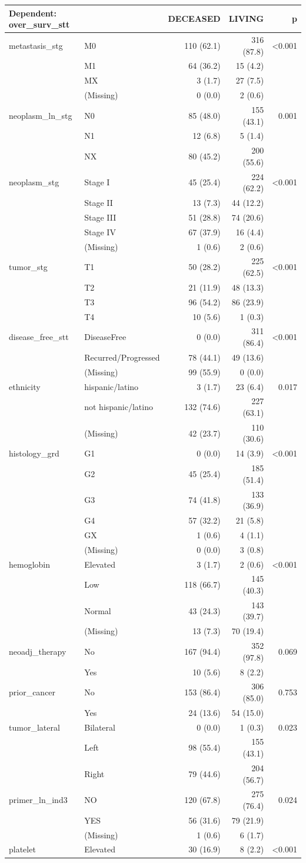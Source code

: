 \documentclass[]{article}
\begin{document}
\begin{longtable}[]{@{}llrrr@{}}
\toprule
Dependent: over\_surv\_stt & & DECEASED & LIVING & p\tabularnewline
\midrule
\endhead
metastasis\_stg & M0 & 110 (62.1) & 316 (87.8) &
\textless{}0.001\tabularnewline
& M1 & 64 (36.2) & 15 (4.2) &\tabularnewline
& MX & 3 (1.7) & 27 (7.5) &\tabularnewline
& (Missing) & 0 (0.0) & 2 (0.6) &\tabularnewline
neoplasm\_ln\_stg & N0 & 85 (48.0) & 155 (43.1) & 0.001\tabularnewline
& N1 & 12 (6.8) & 5 (1.4) &\tabularnewline
& NX & 80 (45.2) & 200 (55.6) &\tabularnewline
neoplasm\_stg & Stage I & 45 (25.4) & 224 (62.2) &
\textless{}0.001\tabularnewline
& Stage II & 13 (7.3) & 44 (12.2) &\tabularnewline
& Stage III & 51 (28.8) & 74 (20.6) &\tabularnewline
& Stage IV & 67 (37.9) & 16 (4.4) &\tabularnewline
& (Missing) & 1 (0.6) & 2 (0.6) &\tabularnewline
tumor\_stg & T1 & 50 (28.2) & 225 (62.5) &
\textless{}0.001\tabularnewline
& T2 & 21 (11.9) & 48 (13.3) &\tabularnewline
& T3 & 96 (54.2) & 86 (23.9) &\tabularnewline
& T4 & 10 (5.6) & 1 (0.3) &\tabularnewline
disease\_free\_stt & DiseaseFree & 0 (0.0) & 311 (86.4) &
\textless{}0.001\tabularnewline
& Recurred/Progressed & 78 (44.1) & 49 (13.6) &\tabularnewline
& (Missing) & 99 (55.9) & 0 (0.0) &\tabularnewline
ethnicity & hispanic/latino & 3 (1.7) & 23 (6.4) & 0.017\tabularnewline
& not hispanic/latino & 132 (74.6) & 227 (63.1) &\tabularnewline
& (Missing) & 42 (23.7) & 110 (30.6) &\tabularnewline
histology\_grd & G1 & 0 (0.0) & 14 (3.9) &
\textless{}0.001\tabularnewline
& G2 & 45 (25.4) & 185 (51.4) &\tabularnewline
& G3 & 74 (41.8) & 133 (36.9) &\tabularnewline
& G4 & 57 (32.2) & 21 (5.8) &\tabularnewline
& GX & 1 (0.6) & 4 (1.1) &\tabularnewline
& (Missing) & 0 (0.0) & 3 (0.8) &\tabularnewline
hemoglobin & Elevated & 3 (1.7) & 2 (0.6) &
\textless{}0.001\tabularnewline
& Low & 118 (66.7) & 145 (40.3) &\tabularnewline
& Normal & 43 (24.3) & 143 (39.7) &\tabularnewline
& (Missing) & 13 (7.3) & 70 (19.4) &\tabularnewline
neoadj\_therapy & No & 167 (94.4) & 352 (97.8) & 0.069\tabularnewline
& Yes & 10 (5.6) & 8 (2.2) &\tabularnewline
prior\_cancer & No & 153 (86.4) & 306 (85.0) & 0.753\tabularnewline
& Yes & 24 (13.6) & 54 (15.0) &\tabularnewline
tumor\_lateral & Bilateral & 0 (0.0) & 1 (0.3) & 0.023\tabularnewline
& Left & 98 (55.4) & 155 (43.1) &\tabularnewline
& Right & 79 (44.6) & 204 (56.7) &\tabularnewline
primer\_ln\_ind3 & NO & 120 (67.8) & 275 (76.4) & 0.024\tabularnewline
& YES & 56 (31.6) & 79 (21.9) &\tabularnewline
& (Missing) & 1 (0.6) & 6 (1.7) &\tabularnewline
platelet & Elevated & 30 (16.9) & 8 (2.2) &
\textless{}0.001\tabularnewline

\end{longtable}
\end{document}
